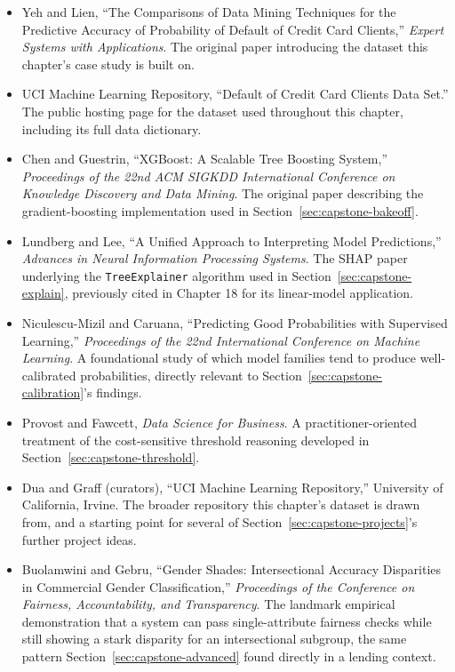 \documentclass[../ai_in_finance]{subfiles}
\begin{document}
\begin{itemize}
    \item Yeh and Lien, ``The Comparisons of Data Mining Techniques for the Predictive Accuracy of Probability of Default of Credit Card Clients,'' \emph{Expert Systems with Applications}. The original paper introducing the dataset this chapter's case study is built on.
    \item UCI Machine Learning Repository, ``Default of Credit Card Clients Data Set.'' The public hosting page for the dataset used throughout this chapter, including its full data dictionary.
    \item Chen and Guestrin, ``XGBoost: A Scalable Tree Boosting System,'' \emph{Proceedings of the 22nd ACM SIGKDD International Conference on Knowledge Discovery and Data Mining}. The original paper describing the gradient-boosting implementation used in Section~\ref{sec:capstone-bakeoff}.
    \item Lundberg and Lee, ``A Unified Approach to Interpreting Model Predictions,'' \emph{Advances in Neural Information Processing Systems}. The SHAP paper underlying the \texttt{TreeExplainer} algorithm used in Section~\ref{sec:capstone-explain}, previously cited in Chapter 18 for its linear-model application.
    \item Niculescu-Mizil and Caruana, ``Predicting Good Probabilities with Supervised Learning,'' \emph{Proceedings of the 22nd International Conference on Machine Learning}. A foundational study of which model families tend to produce well-calibrated probabilities, directly relevant to Section~\ref{sec:capstone-calibration}'s findings.
    \item Provost and Fawcett, \emph{Data Science for Business}. A practitioner-oriented treatment of the cost-sensitive threshold reasoning developed in Section~\ref{sec:capstone-threshold}.
    \item Dua and Graff (curators), ``UCI Machine Learning Repository,'' University of California, Irvine. The broader repository this chapter's dataset is drawn from, and a starting point for several of Section~\ref{sec:capstone-projects}'s further project ideas.
    \item Buolamwini and Gebru, ``Gender Shades: Intersectional Accuracy Disparities in Commercial Gender Classification,'' \emph{Proceedings of the Conference on Fairness, Accountability, and Transparency}. The landmark empirical demonstration that a system can pass single-attribute fairness checks while still showing a stark disparity for an intersectional subgroup, the same pattern Section~\ref{sec:capstone-advanced} found directly in a lending context.
\end{itemize}
\end{document}
